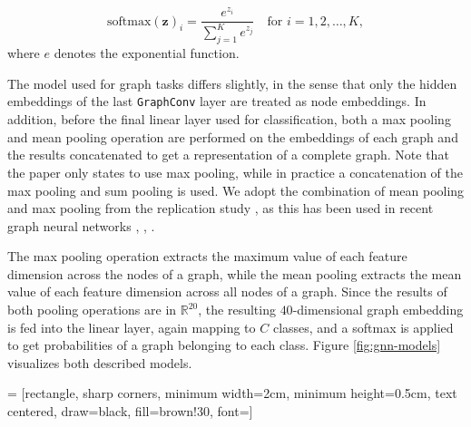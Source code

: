 \begin{equation}
    \text{softmax}(\mathbf{z})_i = \frac{e^{z_i}}{\sum_{j=1}^{K} e^{z_j}} \quad \text{for } i = 1, 2, \dots, K,
\end{equation}
where $e$ denotes the exponential function. \bigskip

The model used for graph tasks differs slightly, in the sense that only the hidden embeddings of the last \lstinline|GraphConv| layer are treated as node embeddings. In addition, before the final linear layer used for classification, both a max pooling and mean pooling operation are performed on the embeddings of each graph and the results concatenated to get a representation of a complete graph. Note that the paper only states to use max pooling, while in practice a concatenation of the max pooling and sum pooling is used. We adopt the combination of mean pooling and max pooling from the replication study \cite{holdijk2021re}, as this has been used in recent graph neural networks \cite{ma2021unsupervised}, \cite{simonovsky2017dynamic}, \cite{zhao2023faithful}. 

The max pooling operation extracts the maximum value of each feature dimension across the nodes of a graph, while the mean pooling extracts the mean value of each feature dimension across all nodes of a graph. Since the results of both pooling operations are in $\mathbb{R}^{20}$, the resulting $40$-dimensional graph embedding is fed into the linear layer, again mapping to $C$ classes, and a softmax is applied to get probabilities of a graph belonging to each class. Figure \ref{fig:gnn-models} visualizes both described models. \bigskip

 = [rectangle, sharp corners, minimum width=2cm, minimum height=0.5cm, text centered, draw=black, fill=brown!30, font=\small]

